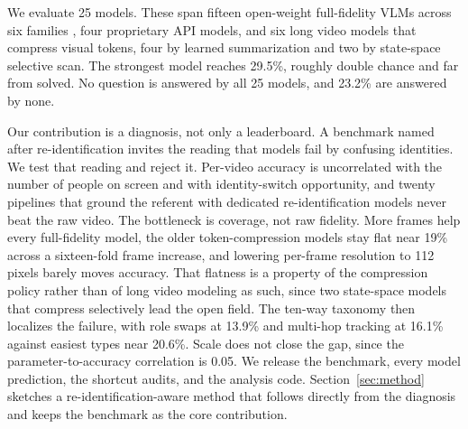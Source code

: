 \documentclass{article}
\newcommand{\nummodels}{25}
\begin{document}
We evaluate \nummodels{} models. These span fifteen open-weight full-fidelity VLMs across six families \citep{internvl3,qwen25vl,gemma3,ovis,videollava,videochatflash}, four proprietary API models, and six long video models that compress visual tokens, four by learned summarization \citep{longvu,malmm,videoxl,videoxlpro} and two by state-space selective scan. The strongest model reaches 29.5\%, roughly double chance and far from solved. No question is answered by all \nummodels{} models, and 23.2\% are answered by none.

Our contribution is a diagnosis, not only a leaderboard. A benchmark named after re-identification invites the reading that models fail by confusing identities. We test that reading and reject it. Per-video accuracy is uncorrelated with the number of people on screen and with identity-switch opportunity, and twenty pipelines that ground the referent with dedicated re-identification models never beat the raw video. The bottleneck is coverage, not raw fidelity. More frames help every full-fidelity model, the older token-compression models stay flat near 19\% across a sixteen-fold frame increase, and lowering per-frame resolution to 112 pixels barely moves accuracy. That flatness is a property of the compression policy rather than of long video modeling as such, since two state-space models that compress selectively lead the open field. The ten-way taxonomy then localizes the failure, with role swaps at 13.9\% and multi-hop tracking at 16.1\% against easiest types near 20.6\%. Scale does not close the gap, since the parameter-to-accuracy correlation is 0.05. We release the benchmark, every model prediction, the shortcut audits, and the analysis code. Section~\ref{sec:method} sketches a re-identification-aware method that follows directly from the diagnosis and keeps the benchmark as the core contribution.
\end{document}
